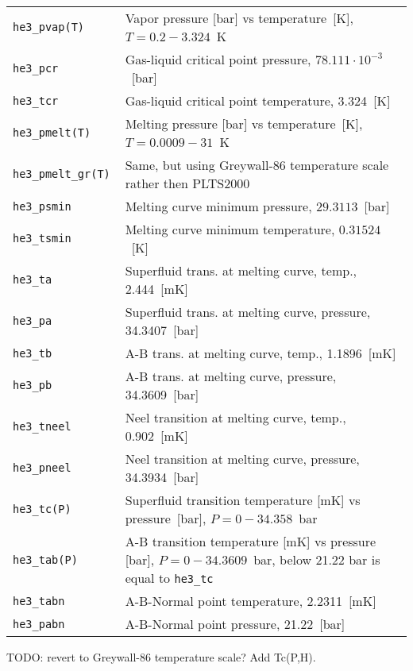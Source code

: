 \documentclass[a4paper]{article}
\begin{document}
\medskip
\noindent\begin{tabular}{lp{12.5cm}}
\tt he3\_pvap(T)  & Vapor pressure [bar] vs temperature~[K],\newline
                    $ T = 0.2 - 3.324$~K \\
\tt he3\_pcr      & Gas-liquid critical point pressure, $78.111\cdot 10^{-3}$~[bar] \\
\tt he3\_tcr      & Gas-liquid critical point temperature, 3.324~[K] \\
\tt he3\_pmelt(T) & Melting pressure [bar] vs temperature~[K],\newline
                    $ T = 0.0009 - 31$~K\\
\tt he3\_pmelt\_gr(T) & Same, but using Greywall-86 temperature scale rather then PLTS2000\\
\tt he3\_psmin    & Melting curve minimum pressure, $29.3113$~[bar]\\
\tt he3\_tsmin    & Melting curve minimum temperature, $0.31524$~[K]\\
\tt he3\_ta       & Superfluid trans. at melting curve, temp., 2.444~[mK]\\
\tt he3\_pa       & Superfluid trans. at melting curve, pressure, 34.3407~[bar]\\
\tt he3\_tb       & A-B trans. at melting curve, temp., 1.1896~[mK]\\
\tt he3\_pb       & A-B trans. at melting curve, pressure, 34.3609~[bar]\\
\tt he3\_tneel    & Neel transition at melting curve, temp., 0.902~[mK]\\
\tt he3\_pneel    & Neel transition at melting curve, pressure, 34.3934~[bar]\\
\tt he3\_tc(P)    & Superfluid transition temperature [mK] vs pressure~[bar],\newline
                    $ P = 0 - 34.358 $~bar\\
\tt he3\_tab(P)   & A-B transition temperature [mK] vs pressure [bar],\newline
                    $ P = 0 - 34.3609 $~bar, below 21.22 bar is equal to {\tt he3\_tc}\\
\tt he3\_tabn     & A-B-Normal point temperature, 2.2311~[mK]\\
\tt he3\_pabn     & A-B-Normal point pressure, 21.22~[bar]\\
\end{tabular}

\noindent TODO: revert to Greywall-86 temperature scale? Add Tc(P,H).
\end{document}
